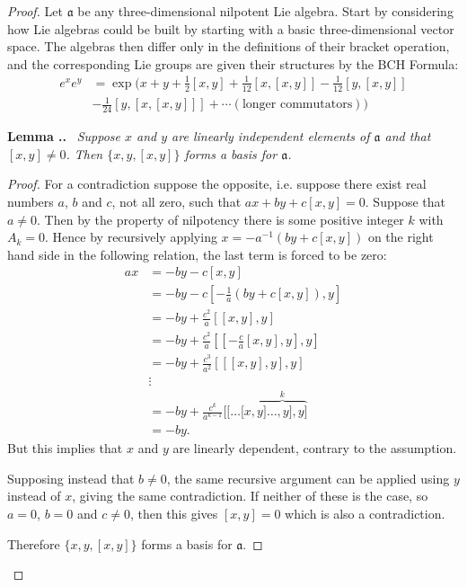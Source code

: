 \documentclass[honours]{UNSWthesis}
\newcommand{\1}{\mathbf{e}_{1}}
\newcommand{\2}{\mathbf{e}_{3}}
\newcommand{\3}{\mathbf{e}_{3}}
\newcounter{Item}[section]
\newenvironment{Lemma}{\medskip
                            \refstepcounter{Item}
                            \noindent
                           {\bf Lemma \thesection.\theItem.}\ %
                            \begingroup \sl}
                           {\endgroup\medskip}
\begin{document}
\begin{proof}
Let $\mathfrak{a}$ be any three-dimensional nilpotent Lie algebra.
Start by considering how Lie algebras could be built by starting with a basic three-dimensional vector space. The algebras then differ only in the definitions of their bracket operation, and the corresponding Lie groups are given their structures by the BCH Formula:
\begin{align*}
e^{x}e^{y} &= \exp\big( x+y+\frac{1}{2}[x,y]+\frac{1}{12}[x,[x,y]]-\frac{1}{12}[y,[x,y]] \\
&-\frac{1}{24}[y,[x,[x,y]]]+\cdots (\text{longer commutators}) \big)
\end{align*}


\begin{Lemma}
Suppose $x$ and $y$ are linearly independent elements of $\mathfrak{a}$ and that $[x,y] \neq 0$. Then $\{x,y,[x,y]\}$ forms a basis for $\mathfrak{a}$.
\begin{proof}
For a contradiction suppose the opposite, i.e. suppose there exist real numbers $a$, $b$ and $c$, not all zero, such that $ax+by+c[x,y]=0$. Suppose that $a \neq 0$. Then by the property of nilpotency there is some positive integer $k$ with $A_{k}=0$. Hence by recursively applying $x=-a^{-1}(by+c[x,y])$ on the right hand side in the following relation, the last term is forced to be zero:
\begin{align*}
ax &= -by-c[x,y]\\
&=-by-c[-\frac{1}{a}(by+c[x,y]),y] \\
&= -by+\frac{c^{2}}{a}[[x,y],y] \\
&= -by+\frac{c^{2}}{a}[[-\frac{c}{a}[x,y],y],y] \\
&= -by+\frac{c^{3}}{a^{2}}[[[x,y],y],y] \\
& \vdots \\
&= -by+\frac{c^{k}}{a^{k-1}}[[\ldots[x,\overbrace{y]\ldots ,y],y]}^{k} \\
&= -by.
\end{align*}
But this implies that $x$ and $y$ are linearly dependent, contrary to the assumption.

Supposing instead that $b \neq 0$, the same recursive argument can be applied using $y$ instead of $x$, giving the same contradiction. \newline
If neither of these is the case, so $a=0$, $b=0$ and $c \neq 0$, then this gives $[x,y]=0$ which is also a contradiction.

 Therefore $\{x,y,[x,y]\}$ forms a basis for $\mathfrak{a}$.
\end{proof}
\end{Lemma}


\end{proof}
\end{document}

